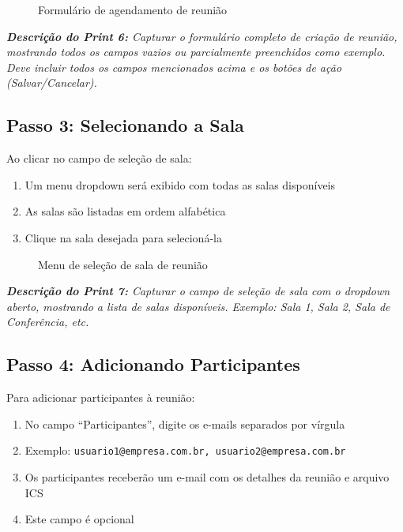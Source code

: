 \documentclass[12pt,a4paper]{article}
\begin{document}
\begin{figure}[H]
    \centering
    \caption{Formulário de agendamento de reunião}
    \label{fig:formulario}
\end{figure}

\textit{\textbf{Descrição do Print 6:} Capturar o formulário completo de criação de reunião, mostrando todos os campos vazios ou parcialmente preenchidos como exemplo. Deve incluir todos os campos mencionados acima e os botões de ação (Salvar/Cancelar).}

\newpage

\subsection{Passo 3: Selecionando a Sala}

Ao clicar no campo de seleção de sala:

\begin{enumerate}[leftmargin=*]
    \item Um menu dropdown será exibido com todas as salas disponíveis
    \item As salas são listadas em ordem alfabética
    \item Clique na sala desejada para selecioná-la
\end{enumerate}

\begin{figure}[H]
    \centering
    \caption{Menu de seleção de sala de reunião}
    \label{fig:selecao_sala}
\end{figure}

\textit{\textbf{Descrição do Print 7:} Capturar o campo de seleção de sala com o dropdown aberto, mostrando a lista de salas disponíveis. Exemplo: Sala 1, Sala 2, Sala de Conferência, etc.}

\subsection{Passo 4: Adicionando Participantes}

Para adicionar participantes à reunião:

\begin{enumerate}[leftmargin=*]
    \item No campo ``Participantes'', digite os e-mails separados por vírgula
    \item Exemplo: \texttt{usuario1@empresa.com.br, usuario2@empresa.com.br}
    \item Os participantes receberão um e-mail com os detalhes da reunião e arquivo ICS
    \item Este campo é opcional
\end{enumerate}
\end{document}
